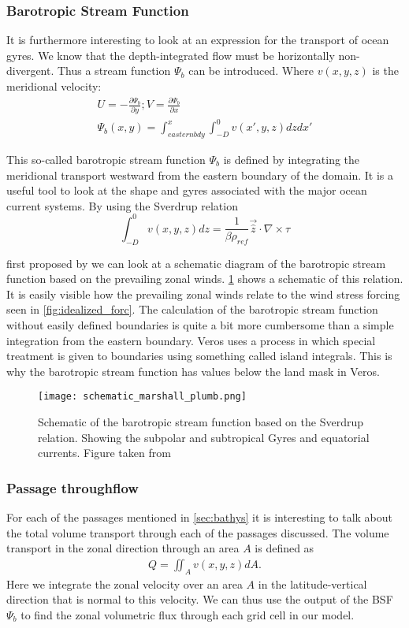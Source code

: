 \begin{multicols}{2}
\subsubsection{Barotropic Stream Function} \label{sec:BSF_theory}
It is furthermore interesting to look at an expression for the transport of ocean gyres. We know that the depth-integrated flow must be horizontally non-divergent. Thus a stream function $\Psi_{b}$ can be introduced. Where $v(x,y,z)$ is the meridional velocity:
\begin{align}
U = -\frac{\partial \Psi_{b}}{\partial y}; V=\frac{\partial \Psi_{b}}{\partial x} \\
\Psi_{b}(x, y) = \int_{eastern bdy}^{x} \int_{-D}^{0} v(x',y,z) dz dx'
\end{align}

This so-called barotropic stream function $\Psi_{b}$ is defined by integrating the meridional transport westward from the eastern boundary of the domain. It is a useful tool to look at the shape and gyres associated with the major ocean current systems. By using the Sverdrup relation
$$
\int_{-D}^{0}v(x,y,z) dz = \frac{1}{\beta \rho_{ref}}\vec{\hat{z}}\cdot \nabla \times \tau
$$

first proposed by \cite{sverdrup1947wind} we can look at a schematic diagram of the barotropic stream function based on the prevailing zonal winds. \cref{fig:schem_currents} shows a schematic of this relation. It is easily visible how the prevailing zonal winds relate to the wind stress forcing seen in \cref{fig:idealized_forc}. The calculation of the barotropic stream function without easily defined boundaries is quite a bit more cumbersome than a simple integration from the eastern boundary. Veros uses a process in which special treatment is given to boundaries using something called island integrals. This is why the barotropic stream function has values below the land mask in Veros. 
 
  \begin{figure}[H]
 	\texttt{[image: schematic\_marshall\_plumb.png]}
 	\caption{Schematic of the barotropic stream function based on the Sverdrup relation. Showing the subpolar and subtropical Gyres and equatorial currents. Figure taken from \cite{MarschallPlumb}}
 	\label{fig:schem_currents}
 \end{figure}
\subsubsection{Passage throughflow}\label{sec:throughflowp}
For each of the passages mentioned in \cref{sec:bathys} it is interesting to talk about the total volume transport through each of the passages discussed. The volume transport in the zonal direction through an area $A$ is defined as 
\begin{align}
Q = \iint_A v(x,y,z) dA.
\end{align}	
Here we integrate the zonal velocity over an area $A$ in the latitude-vertical direction that is normal to this velocity. We can thus use the output of the BSF $\Psi_b$ to find the zonal volumetric flux through each grid cell in our model.


\end{multicols}
